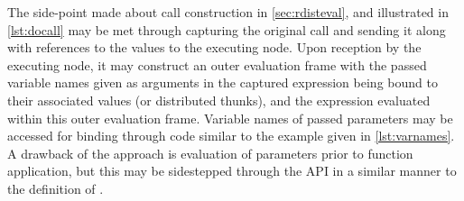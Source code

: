 The side-point made about call construction in \cref{sec:rdisteval}, and illustrated in \cref{lst:docall} may be met through capturing the original call and sending it along with references to the values to the executing node.
Upon reception by the executing node, it may construct an outer evaluation frame with the passed variable names given as arguments in the captured expression being bound to their associated values (or distributed thunks)\cite{ingerman1961thunks}, and the expression evaluated within this outer evaluation frame.
Variable names of passed parameters may be accessed for binding through code similar to the example given in \cref{lst:varnames}.
A drawback of the approach is evaluation of parameters prior to function application, but this may be sidestepped through the  API in a similar manner to the definition of \cite{abelson1996sicp}.

